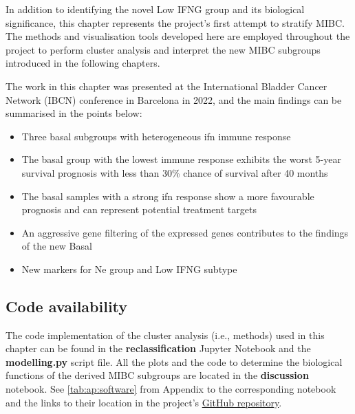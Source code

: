 In addition to identifying the novel Low IFNG group and its biological significance, this chapter represents the project's first attempt to stratify MIBC. The methods and visualisation tools developed here are employed throughout the project to perform cluster analysis and interpret the new MIBC subgroups introduced in the following chapters.

The work in this chapter was presented at the International Bladder Cancer Network (IBCN) conference in Barcelona in 2022, and the main findings can be summarised in the points below:

\begin{itemize}
    \item Three basal subgroups with heterogeneous \acrlong{ifn} immune response
    \item The basal group with the lowest immune response exhibits the worst 5-year survival prognosis with less than 30\% chance of survival after 40 months
    \item The basal samples with a strong \acrshort{ifn} response show a more favourable prognosis and can represent potential treatment targets
    \item An aggressive gene filtering of the expressed genes contributes to the findings of the new Basal 
    \item New markers for Ne group and Low IFNG subtype
\end{itemize}

\subsection{Code availability}

The code implementation of the cluster analysis (i.e., methods) used in this chapter can be found in the \textbf{reclassification} Jupyter Notebook and the \textbf{modelling.py} script file. All the plots and the code to determine the biological functions of the derived MIBC subgroups are located in the \textbf{discussion} notebook. See \cref{tab:ap:software} from Appendix to the corresponding notebook and the links to their location in the project's \href{https://github.com/vladUng/PhD_thesis_exp/}{GitHub repository}.
